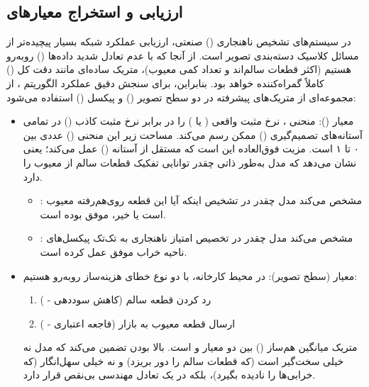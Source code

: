 \documentclass{article}
\begin{document}
\subsection{ارزیابی و استخراج معیارهای }

در سیستم‌های تشخیص ناهنجاری () صنعتی، ارزیابی عملکرد شبکه بسیار پیچیده‌تر از مسائل کلاسیک دسته‌بندی تصویر است. از آنجا که با عدم تعادل شدید داده‌ها () روبه‌رو هستیم (اکثر قطعات سالم‌اند و تعداد کمی معیوب)، متریک ساده‌ای مانند دقت کل () کاملاً گمراه‌کننده خواهد بود. بنابراین، برای سنجش دقیق عملکرد الگوریتم ، از مجموعه‌ای از متریک‌های پیشرفته در دو سطح تصویر () و پیکسل () استفاده می‌شود:

\begin{itemize}
	\item معیار  ():  منحنی ، نرخ مثبت واقعی ( یا ) را در برابر نرخ مثبت کاذب () در تمامی آستانه‌های تصمیم‌گیری () ممکن رسم می‌کند. مساحت زیر این منحنی () عددی بین ۰ تا ۱ است. مزیت فوق‌العاده  این است که مستقل از آستانه () عمل می‌کند؛ یعنی نشان می‌دهد که مدل به‌طور ذاتی چقدر توانایی تفکیک قطعات سالم از معیوب را دارد.
	\begin{itemize}
		\item {}: مشخص می‌کند مدل چقدر در تشخیص اینکه آیا این قطعه روی‌هم‌رفته معیوب است یا خیر، موفق بوده است.
		\item {}: مشخص می‌کند مدل چقدر در تخصیص امتیاز ناهنجاری به تک‌تک پیکسل‌های ناحیه خراب موفق عمل کرده است.
	\end{itemize}
	
	\item معیار  (سطح تصویر): در محیط کارخانه، با دو نوع خطای هزینه‌ساز روبه‌رو هستیم:
	\begin{enumerate}
		\item رد کردن قطعه سالم (کاهش سوددهی - )
		\item ارسال قطعه معیوب به بازار (فاجعه اعتباری - )
	\end{enumerate}
	متریک  میانگین هم‌ساز () بین دو معیار  و  است. بالا بودن  تضمین می‌کند که مدل نه خیلی سخت‌گیر است (که قطعات سالم را دور بریزد) و نه خیلی سهل‌انگار (که خرابی‌ها را نادیده بگیرد)، بلکه در یک تعادل مهندسی بی‌نقص قرار دارد.
	

\end{itemize}
\end{document}
